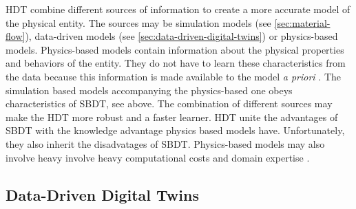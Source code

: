 HDT combine different sources of information to create a more accurate model of the physical entity. The sources may be simulation models (see \autoref{sec:material-flow}), data-driven models (see \autoref{sec:data-driven-digital-twins}) or physics-based models. Physics-based models contain information about the physical properties and behaviors of the entity. They do not have to learn these characteristics from the data because this information is made available to the model \textit{a priori} \parencite{kapteyn2022data,aivaliotis2019methodology}. The simulation based models accompanying the physics-based one obeys characteristics of SBDT, see above. The combination of different sources may make the HDT more robust and a faster learner. HDT unite the advantages of SBDT with the knowledge advantage physics based models have. Unfortunately, they also inherit the disadvatages of SBDT. Physics-based models may also involve heavy involve heavy computational costs and domain expertise \parencite{kapteyn2022data}.

\subsection{Data-Driven Digital Twins}
\label{sec:data-driven-digital-twins}

